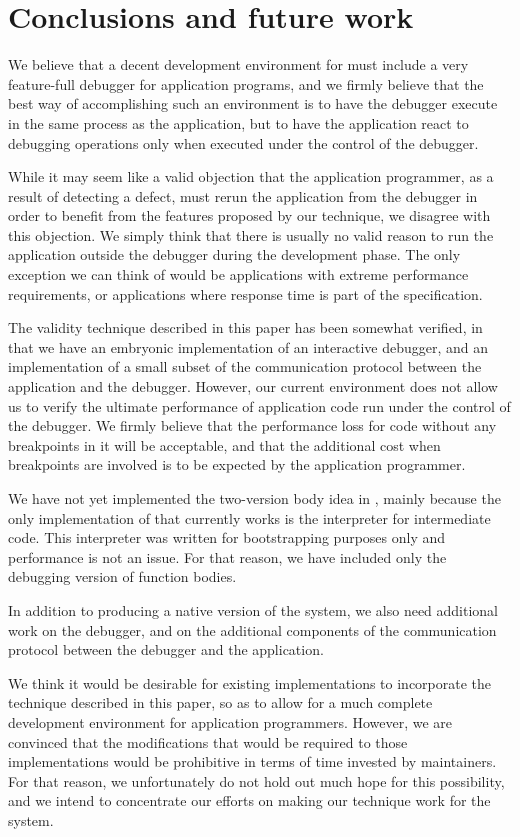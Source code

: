 \section{Conclusions and future work}

We believe that a decent development environment for \commonlisp{}
must include a very feature-full debugger for application programs, and
we firmly believe that the best way of accomplishing such an
environment is to have the debugger execute in the same process as the
application, but to have the application react to debugging operations
only when executed under the control of the debugger.

While it may seem like a valid objection that the application
programmer, as a result of detecting a defect, must rerun the
application from the debugger in order to benefit from the features
proposed by our technique, we disagree with this objection.  We simply
think that there is usually no valid reason to run the application
outside the debugger during the development phase.  The only exception
we can think of would be applications with extreme performance
requirements, or applications where response time is part of the
specification.

The validity technique described in this paper has been somewhat
verified, in that we have an embryonic implementation of an
interactive debugger, and an implementation of a small subset of the
communication protocol between the application and the debugger.
However, our current environment does not allow us to verify the
ultimate performance of application code run under the control of the
debugger.  We firmly believe that the performance loss for code
without any breakpoints in it will be acceptable, and that the
additional cost when breakpoints are involved is to be expected by the
application programmer.

We have not yet implemented the two-version body idea in \sicl{},
mainly because the only implementation of \sicl{} that currently works
is the interpreter for intermediate code.  This interpreter was
written for bootstrapping purposes only and performance is not an
issue.  For that reason, we have included only the debugging version
of function bodies.

In addition to producing a native version of the \sicl{} system, we
also need additional work on the \clordane{} debugger, and on the
additional components of the communication protocol between the
debugger and the application.

We think it would be desirable for existing \commonlisp{}
implementations to incorporate the technique described in this paper,
so as to allow for a much complete development environment for
application programmers.  However, we are convinced that the
modifications that would be required to those implementations would be
prohibitive in terms of time invested by maintainers.  For that
reason, we unfortunately do not hold out much hope for this
possibility, and we intend to concentrate our efforts on making our
technique work for the \sicl{} system.
